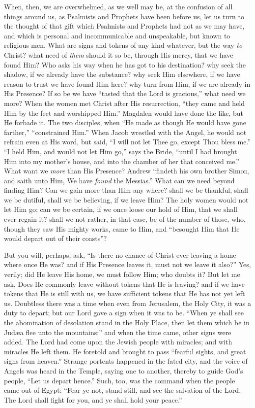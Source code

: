 When, then, we are overwhelmed, as we well may be, at the confusion
of all things around us, as Psalmists and Prophets have been before
us, let us turn to the thought of that gift which Psalmists and
Prophets had not as we may have, and which is personal and
incommunicable and unspeakable, but known to religious men. What are
signs and tokens of any kind whatever, but the way \emph{to} Christ?
what need of \emph{them} should it so be, through His mercy, that we
have found Him? Who asks his way when he has got to his destination?
why seek the shadow, if we already have the substance? why seek Him
elsewhere, if we have reason to trust we have found Him here? why turn
from Him, if we are already in His Presence? If so be we have
``tasted that the Lord is gracious,'' what need we more? When
the women met Christ after His resurrection, ``they came and held
Him by the feet and worshipped Him.'' Magdalen would have done the
like, but He forbade it. The two disciples, when ``He made as
though He would have gone farther,'' ``constrained Him.''
When Jacob wrestled with the Angel, he would not refrain even at His
word, but said, ``I will not let Thee go, except Thou bless
me.'' ``I held Him, and would not let Him go,'' says the
Bride, ``until I had brought Him into my mother's house, and into
the chamber of her that conceived me.'' What want we \emph{more}
than His Presence? Andrew ``findeth his own brother Simon, and
saith unto Him, We have \emph{found} the Messias.'' What can we
need beyond finding Him? Can we gain more than Him any where? shall we
be thankful, shall we be dutiful, shall we be believing, if we leave
Him? The holy women would not let Him go; can we be certain, if we
once loose our hold of Him, that we shall ever regain it? shall we not
rather, in that case, be of the number of those, who, though they saw
His mighty works, came to Him, and ``besought Him that He would
depart out of their coasts''?

But you will, perhaps, ask, ``Is there no chance of Christ ever
leaving a home where once He was? and if His Presence leaves it, must
not we leave it also?'' Yes, verily; did He leave His home, we
must follow Him; who doubts it? But let me ask, Does He commonly leave
without tokens that He is leaving? and if we have tokens that He is
still with us, we have sufficient tokens that He has not yet left us.
Doubtless there was a time when even from Jerusalem, the Holy City, it
was a duty to depart; but our Lord gave a sign when it was to be.
``When ye shall see the abomination of desolation stand in the
Holy Place, then let them which be in Judæa flee unto the
mountains;'' and when the time came, other signs were added. The
Lord had come upon the Jewish people with miracles; and with miracles
He left them. He foretold and brought to pass ``fearful sights,
and great signs from heaven.'' Strange portents happened in the
fated city, and the voice of Angels was heard in the Temple, saying
one to another, thereby to guide God's people, ``Let us depart
hence.'' Such, too, was the command when the people came out of
Egypt: ``Fear ye not, stand still, and see the salvation of the
Lord. The Lord shall fight for you, and ye shall hold your
peace.''

